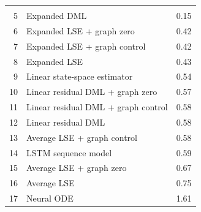 \begin{tabular}{rlr}
\addlinespace[2pt]
\multicolumn{3}{l}{\textbf{not retained at \(\delta=0\)}} \\
5 & Expanded DML & 0.15 \\
6 & Expanded LSE + graph zero & 0.42 \\
7 & Expanded LSE + graph control & 0.42 \\
8 & Expanded LSE & 0.43 \\
9 & Linear state-space estimator & 0.54 \\
10 & Linear residual DML + graph zero & 0.57 \\
11 & Linear residual DML + graph control & 0.58 \\
12 & Linear residual DML & 0.58 \\
13 & Average LSE + graph control & 0.58 \\
14 & LSTM sequence model & 0.59 \\
15 & Average LSE + graph zero & 0.67 \\
16 & Average LSE & 0.75 \\
17 & Neural ODE & 1.61 \\
\bottomrule
\end{tabular}
